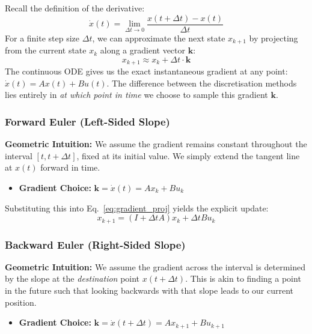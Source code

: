 \documentclass[a4paper,11pt]{article}
\begin{document}
Recall the definition of the derivative:
\begin{equation}
    \dot{x}(t) = \lim_{\Delta t \to 0} \frac{x(t+\Delta t) - x(t)}{\Delta t}
\end{equation}
For a finite step size $\Delta t$, we can approximate the next state $x_{k+1}$ by projecting from the current state $x_k$ along a gradient vector $\mathbf{k}$:
\begin{equation} \label{eq:gradient_proj}
    x_{k+1} \approx x_k + \Delta t \cdot \mathbf{k}
\end{equation}
The continuous ODE gives us the exact instantaneous gradient at any point: $\dot{x}(t) = A x(t) + B u(t)$. The difference between the discretisation methods lies entirely in \textit{at which point in time} we choose to sample this gradient $\mathbf{k}$.

\subsubsection{Forward Euler (Left-Sided Slope)}
\textbf{Geometric Intuition:} We assume the gradient remains constant throughout the interval $[t, t+\Delta t]$, fixed at its initial value. We simply extend the tangent line at $x(t)$ forward in time.

\begin{itemize}
    \item \textbf{Gradient Choice:} $\mathbf{k} = \dot{x}(t) = A x_k + B u_k$
\end{itemize}

Substituting this into Eq.~\eqref{eq:gradient_proj} yields the explicit update:
\begin{equation} \label{eq:fe_geom}
    x_{k+1} = (I + \Delta t A) x_k + \Delta t B u_k
\end{equation}

\subsubsection{Backward Euler (Right-Sided Slope)}
\textbf{Geometric Intuition:} We assume the gradient across the interval is determined by the slope at the \textit{destination} point $x(t+\Delta t)$. This is akin to finding a point in the future such that looking backwards with that slope leads to our current position.

\begin{itemize}
    \item \textbf{Gradient Choice:} $\mathbf{k} = \dot{x}(t+\Delta t) = A x_{k+1} + B u_{k+1}$
\end{itemize}
\end{document}
